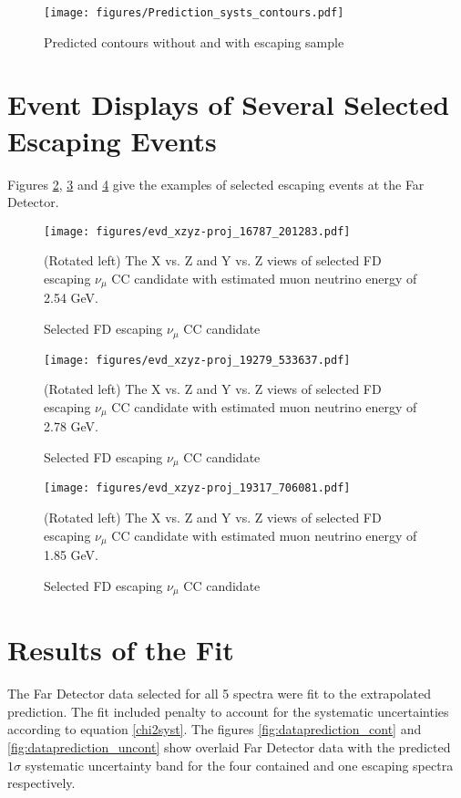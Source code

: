 \begin{figure}[!th]
\centering
\texttt{[image: figures/Prediction\_systs\_contours.pdf]}
\caption{Predicted contours without and with escaping sample}
{}
\label{fig:cont_pred}
\end{figure}


\section{Event Displays of Several Selected Escaping Events}
Figures \ref{fig:candidate1}, \ref{fig:candidate2} and \ref{fig:candidate3} give the examples of selected escaping 
events at the Far Detector.
\clearpage
\begin{figure}[!th]
\centering
\texttt{[image: figures/evd\_xzyz-proj\_16787\_201283.pdf]}
\caption{Selected FD escaping $\nu_\mu$ CC candidate}
{(Rotated left) The X vs. Z and Y vs. Z views of selected FD escaping $\nu_\mu$ CC candidate with estimated muon 
neutrino energy of 2.54 GeV.}
\label{fig:candidate1}
\end{figure}

\clearpage
\begin{figure}[!th]
\centering
\texttt{[image: figures/evd\_xzyz-proj\_19279\_533637.pdf]}
\caption{Selected FD escaping $\nu_\mu$ CC candidate}
{(Rotated left) The X vs. Z and Y vs. Z views of selected FD escaping $\nu_\mu$ CC candidate with estimated muon
neutrino energy of 2.78 GeV.}
\label{fig:candidate2}
\end{figure}

\clearpage
\begin{figure}[!th]
\centering
\texttt{[image: figures/evd\_xzyz-proj\_19317\_706081.pdf]}
\caption{Selected FD escaping $\nu_\mu$ CC candidate}
{(Rotated left) The X vs. Z and Y vs. Z views of selected FD escaping $\nu_\mu$ CC candidate with estimated muon
neutrino energy of 1.85 GeV.}
\label{fig:candidate3}
\end{figure}

\clearpage
\section{Results of the Fit}
The Far Detector data selected for all 5 spectra were fit to the extrapolated prediction. The fit included penalty to 
account for the systematic uncertainties according to equation \ref{chi2syst}. The figures \ref{fig:dataprediction_cont}
and \ref{fig:dataprediction_uncont} show overlaid Far Detector data with the predicted $1\sigma$ systematic uncertainty band
for the four contained and one escaping spectra respectively.  

